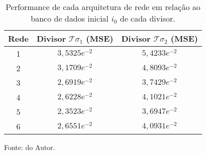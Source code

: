 



\begin{table}[H]
    \centering
    \caption{Performance de cada arquitetura de rede em relação ao banco de dados inicial $i_{0}$ de cada divisor.}
    \begin{tabular}{ccc}
\hline
Rede & \multicolumn{1}{r}{Divisor $\mathcal{T}\sigma_{1}$ (MSE)} & \multicolumn{1}{r}{Divisor $\mathcal{T}\sigma_{2}$ (MSE)} \\ \hline
1    & $3,5325e^{-2}$                                            & $5,4233e^{-2}$                                            \\
2    & $3,1709e^{-2}$                                            & $4,8093e^{-2}$                                            \\
3    & $2,6919e^{-2}$                                            & $3,7429e^{-2}$                                            \\
4    & $2,6228e^{-2}$                                            & $4,1021e^{-2}$                                            \\
5    & $2,3523e^{-2}$                                            & $3,6947e^{-2}$                                            \\
6    & $2,6551e^{-2}$                                            & $4,0931e^{-2}$                                            \\ \hline
\end{tabular}

    \label{tab: ArquiteturaRedeDivisor}

    \vspace{2.5mm}
    Fonte: do Autor.

    \end{table}